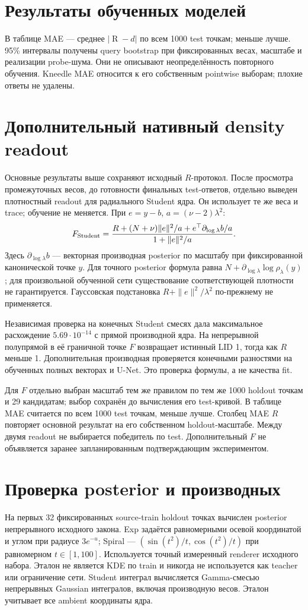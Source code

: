 \documentclass[10pt,a4paper]{article}
\newcommand{\R}{\operatorname{R}}
\begin{document}
\section*{Результаты обученных моделей}
В таблице MAE --- среднее $|\R-d|$ по всем 1000 test точкам; меньше лучше.
95\% интервалы получены query bootstrap при фиксированных весах, масштабе и
реализации probe-шума. Они не описывают неопределённость повторного обучения.
Kneedle MAE относится к его собственным pointwise выборам; плохие ответы не удалены.



\section*{Дополнительный нативный density readout}
Основные результаты выше сохраняют исходный $R$-протокол. После просмотра
промежуточных весов, до готовности финальных test-ответов, отдельно выведен
плотностный readout для радиального Student ядра. Он использует те же веса
и trace; обучение не меняется. При $e=y-b$, $a=(\nu-2)\lambda^2$:
\[
 F_{\rm Student}=
 \frac{R+(N+\nu)\|e\|^2/a+e^\top\partial_{\log\lambda}b/a}
 {1+\|e\|^2/a}.
\]
Здесь $\partial_{\log\lambda}b$ --- векторная производная posterior по масштабу
при фиксированной канонической точке $y$. Для точного posterior формула равна
$N+\partial_{\log\lambda}\log\rho_\lambda(y)$; для произвольной обученной
сети существование соответствующей плотности не гарантируется. Гауссовская
подстановка $R+\|e\|^2/\lambda^2$ по-прежнему не применяется.

Независимая проверка на конечных Student смесях дала максимальное расхождение
$5.69\cdot10^{-14}$ с прямой производной ядра. На непрерывной полупрямой в
её граничной точке $F$ возвращает истинный LID 1, тогда как $R$ меньше 1.
Дополнительная производная проверяется конечными разностями на обученных
полных векторах и U-Net. Это проверка формулы, а не качества fit.

Для $F$ отдельно выбран масштаб тем же правилом по тем же 1000 holdout
точкам и 29 кандидатам; выбор сохранён до вычисления его test-кривой.
В таблице MAE считается по всем 1000 test точкам, меньше лучше. Столбец
MAE $R$ повторяет основной результат на его собственном holdout-масштабе.
Между двумя readout не выбирается победитель по test. Дополнительный $F$
не объявляется заранее запланированным подтверждающим экспериментом.


\section*{Проверка posterior и производных}
На первых 32 фиксированных source-train holdout точках вычислен posterior
непрерывного исходного закона. Exp задаётся равномерными осевой координатой
и углом при радиусе $3e^{-u}$; Spiral ---
$(\sin(t^2)/t,\cos(t^2)/t)$ при равномерном $t\in[1,100]$.
Используется точный измеренный renderer исходного набора. Эталон не является
KDE по train и никогда не используется как teacher или ограничение сети.
Student интеграл вычисляется Gamma-смесью непрерывных Gaussian интегралов,
включая производную весов. Эталон учитывает все ambient координаты ядра.
\end{document}
